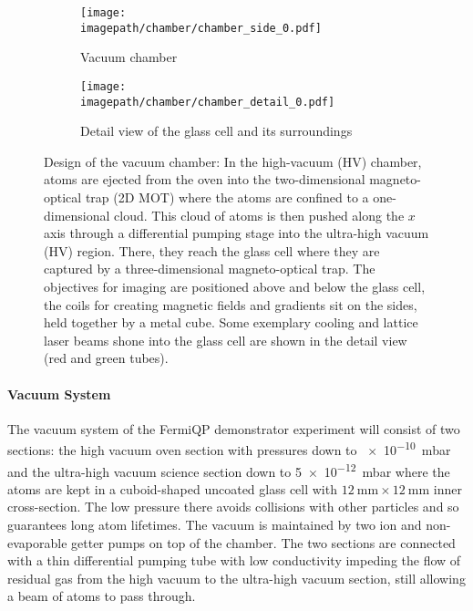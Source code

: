 \begin{figure}
    \centering
    \begin{subfigure}[t]{0.64\textwidth}
        \centering
        \texttt{[image: \\imagepath/chamber/chamber\_side\_0.pdf]}
        \caption{Vacuum chamber}
        \label{fig:chamber_coarse}
    \end{subfigure}
    \begin{subfigure}[t]{0.34\textwidth}
        \centering
        \texttt{[image: \\imagepath/chamber/chamber\_detail\_0.pdf]}
        \caption{Detail view of the glass cell and its surroundings}
        \label{fig:chamber_detail}
    \end{subfigure}
    \caption{Design of the vacuum chamber: In the high-vacuum (HV) chamber, atoms are ejected from the oven into the two-dimensional magneto-optical trap (2D MOT) where the atoms are confined to a one-dimensional cloud. This cloud of atoms is then pushed along the $x$ axis through a differential pumping stage into the ultra-high vacuum (HV) region. There, they reach the glass cell where they are captured by a three-dimensional magneto-optical trap. The objectives for imaging are positioned above and below the glass cell, the coils for creating magnetic fields and gradients sit on the sides, held together by a metal cube. Some exemplary cooling and lattice laser beams shone into the glass cell are shown in the detail view (red and green tubes).}
    \label{fig:chamber}
\end{figure}

\paragraph{Vacuum System}
The vacuum system of the FermiQP demonstrator experiment will consist of two sections: the high vacuum oven section with pressures down to \SI[]{e-10}{\milli\bar} and the ultra-high vacuum science section down to \SI[]{5e-12}{\milli\bar} where the atoms are kept in a cuboid-shaped uncoated glass cell  with $\SI[]{12}{\milli\meter} \times \SI[]{12}{\milli\meter}$ inner cross-section. The low pressure there avoids collisions with other particles and so guarantees long atom lifetimes. The vacuum is maintained by two ion and non-evaporable getter pumps on top of the chamber. The two sections are connected with a thin differential pumping tube with low conductivity impeding the flow of residual gas from the high vacuum to the ultra-high vacuum section, still allowing a beam of atoms to pass through.

